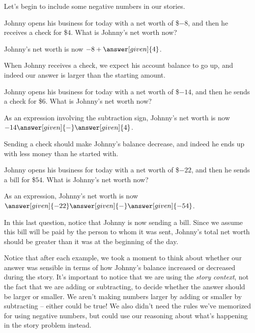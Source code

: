 \documentclass{ximera}
\begin{document}
Let's begin to include some negative numbers in our stories.
\begin{question}
Johnny opens his business for today with a net worth of \$$-8$, and then he receives a 
check for \$$4$.  What is Johnny's net worth now?
\begin{prompt}
Johnny's net worth is now $-8 + \answer[given]{4}$.
\end{prompt}
\end{question}

When Johnny receives a check, we expect his account balance to go up, and indeed our answer is larger than the starting amount.


\begin{question}
Johnny opens his business for today with a net worth of \$$-14$, and then he sends a check for \$$6$.  
What is Johnny's net worth now?

\begin{prompt}
As an expression involving the subtraction sign, Johnny's net worth is now $-14 \answer[given]{-} \answer[given]{4}$.
\end{prompt}
\end{question}
Sending a check should make Johnny's balance decrease, and indeed he ends up with less money than he started with.


\begin{question}
Johnny opens his business for today with a net worth of \$$-22$, and then he sends a bill for \$$54$.  
What is Johnny's net worth now?

\begin{prompt}
As an  expression, Johnny's net worth is now $\answer[given]{-22} \answer[given]{-} \answer[given]{-54}$.
\end{prompt}
\end{question}
In this last question, notice that Johnny is now sending a bill.  Since we assume this bill will be paid 
by the person to whom it was sent, Johnny's total net worth should be greater than it was at the 
beginning of the day. 

Notice that after each example, we took a moment to think about whether our answer was sensible in terms of how Johnny's balance increased or decreased during the story. It's important to notice that we are using the {\em story context}, not the fact that we are adding or subtracting, to decide whether the answer should be larger or smaller. We aren't making numbers larger by adding or smaller by subtracting -- either could be true! We also didn't need the rules we've memorized for using negative numbers, but could use our reasoning about what's happening in the story problem instead. 
\end{document}

